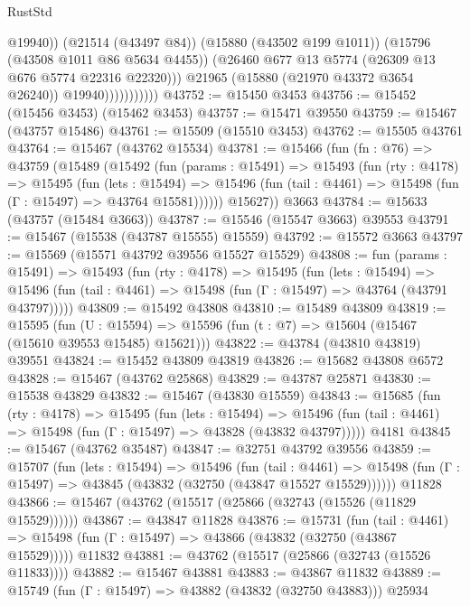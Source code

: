 \begin{lexlean}{RustStd}
\begin{coremodule}
                                @19940))
                            (@21514 (@43497 @84))
                            (@15880 (@43502 @199 @1011))
                            (@15796 (@43508 @1011 @86 @5634 @4455))
                            (@26460 @677 @13 @5774 (@26309 @13 @676 @5774 @22316 @22320)))
                          @21965
                          (@15880 (@21970 @43372 @3654 @26240))
                          @19940)))))))))))
@43752 := @15450 @3453
@43756 := @15452 (@15456 @3453) (@15462 @3453)
@43757 := @15471 @39550
@43759 := @15467 (@43757 @15486)
@43761 := @15509 (@15510 @3453)
@43762 := @15505 @43761
@43764 := @15467 (@43762 @15534)
@43781 := @15466
    (fun (fn : @76) =>
    @43759
      (@15489
        (@15492
          (fun (params : @15491) =>
          @15493
            (fun (rty : @4178) =>
            @15495
              (fun (lets : @15494) =>
              @15496 (fun (tail : @4461) => @15498 (fun (Γ : @15497) => @43764 @15581))))))
        @15627))
    @3663
@43784 := @15633 (@43757 (@15484 @3663))
@43787 := @15546 (@15547 @3663) @39553
@43791 := @15467 (@15538 (@43787 @15555) @15559)
@43792 := @15572 @3663
@43797 := @15569 (@15571 @43792 @39556 @15527 @15529)
@43808 := fun (params : @15491) =>
  @15493
    (fun (rty : @4178) =>
    @15495
      (fun (lets : @15494) =>
      @15496 (fun (tail : @4461) => @15498 (fun (Γ : @15497) => @43764 (@43791 @43797)))))
@43809 := @15492 @43808
@43810 := @15489 @43809
@43819 := @15595
    (fun (U : @15594) => @15596 (fun (t : @7) => @15604 (@15467 (@15610 @39553 @15485) @15621)))
@43822 := @43784 (@43810 @43819) @39551
@43824 := @15452 @43809 @43819
@43826 := @15682 @43808 @6572
@43828 := @15467 (@43762 @25868)
@43829 := @43787 @25871
@43830 := @15538 @43829
@43832 := @15467 (@43830 @15559)
@43843 := @15685
    (fun (rty : @4178) =>
    @15495
      (fun (lets : @15494) =>
      @15496 (fun (tail : @4461) => @15498 (fun (Γ : @15497) => @43828 (@43832 @43797)))))
    @4181
@43845 := @15467 (@43762 @35487)
@43847 := @32751 @43792 @39556
@43859 := @15707
    (fun (lets : @15494) =>
    @15496
      (fun (tail : @4461) =>
      @15498 (fun (Γ : @15497) => @43845 (@43832 (@32750 (@43847 @15527 @15529))))))
    @11828
@43866 := @15467 (@43762 (@15517 (@25866 (@32743 (@15526 (@11829 @15529))))))
@43867 := @43847 @11828
@43876 := @15731
    (fun (tail : @4461) => @15498 (fun (Γ : @15497) => @43866 (@43832 (@32750 (@43867 @15529)))))
    @11832
@43881 := @43762 (@15517 (@25866 (@32743 (@15526 @11833))))
@43882 := @15467 @43881
@43883 := @43867 @11832
@43889 := @15749 (fun (Γ : @15497) => @43882 (@43832 (@32750 @43883))) @25934

\end{coremodule}
\end{lexlean}
